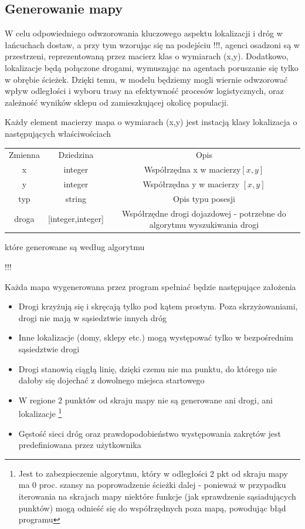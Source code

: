 \documentclass{article}
\begin{document}
\subsection{Generowanie mapy}

W celu odpowiedniego odwzorowania kluczowego aspektu lokalizacji i dróg w łańcuchach dostaw, a przy tym wzorując się na podejściu !!!, agenci osadzoni są w przestrzeni, reprezentowaną przez macierz klas o wymiarach (x,y). Dodatkowo, lokalizacje będą połączone drogami, wymusząjąc na agentach poruszanie się tylko w obrębie ścieżek. Dzięki temu, w modelu będziemy mogli wiernie odwzorować wpływ odległości i wyboru trasy na efektywność procesów logistycznych, oraz zależność wyników sklepu od zamieszkującej okolicę populacji.

Każdy element macierzy mapa o wymiarach (x,y) jest instacją klasy lokalizacja o następujących właściwościach 


\begin{tabular}{ c c c }
Zmienna & Dziedzina & Opis \\ 
x & integer & Współrzędna x w macierzy$[x,y]$ \\
y & integer & Współrzędna y w macierzy $[x,y]$ \\
typ & string & Opis typu posesji \\
droga & [integer,integer] & Współrzędne drogi dojazdowej - potrzebne do algorytmu wyszukiwania drogi

\end{tabular}

które generowane są według algorytmu

!!!

Każda mapa wygenerowana przez program spełniać będzie następujące założenia

	\begin{itemize}
		\item Drogi krzyżują się i skręcają tylko pod kątem prostym. Poza skrzyżowaniami, drogi nie mają w sąsiedztwie innych dróg
		\item Inne lokalizacje (domy, sklepy etc.) mogą występować tylko w bezpośrednim sąsiedztwie drogi
		\item Drogi stanowią ciągłą linię, dzięki czemu nie ma punktu, do którego nie dałoby się dojechać z dowolnego miejsca startowego
		\item W regione 2 punktów od skraju mapy nie są generowane ani drogi, ani lokalizacje  \footnote{Jest to zabezpieczenie algorytmu, który w odległości 2 pkt od skraju mapy ma 0 proc. szansy na poprowadzenie ścieżki dalej - ponieważ w przypadku iterowania na skrajach mapy niektóre funkcje (jak sprawdzenie sąsiadujących punktów) mogą odnieść się do współrzędnych poza mapą, powodując błąd programu}
	 	\item Gęstość sieci dróg oraz prawdopodobieństwo występowania zakrętów jest predefiniowana przez użytkownika
	\end{itemize}
\end{document}
